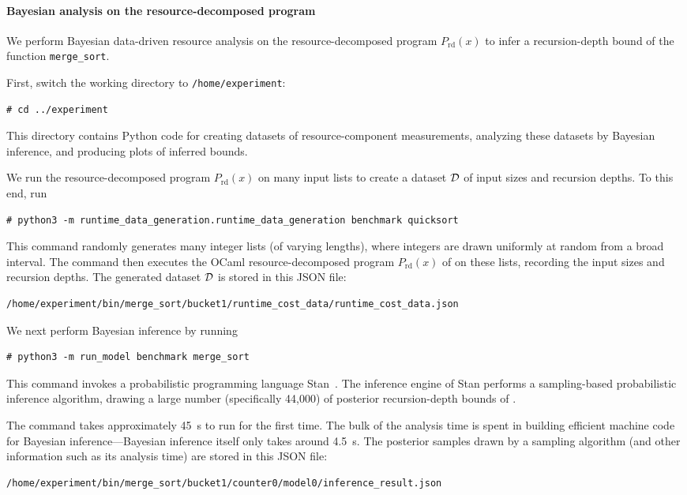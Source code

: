 \paragraph{Bayesian analysis on the resource-decomposed program}

We perform Bayesian data-driven resource analysis on the resource-decomposed
program $P_{\mathrm{rd}}(x)$ to infer a recursion-depth bound of the function
\texttt{merge\_sort}.

First, switch the working directory to \texttt{/home/experiment}:
\begin{verbatim}
# cd ../experiment
\end{verbatim}
%
This directory contains Python code for creating datasets of resource-component
measurements, analyzing these datasets by Bayesian inference, and producing
plots of inferred bounds.

We run the resource-decomposed program $P_{\mathrm{rd}}(x)$ on many input lists
to create a dataset $\mathcal{D}$ of input sizes and recursion depths.
%
To this end, run
\begin{verbatim}
# python3 -m runtime_data_generation.runtime_data_generation benchmark quicksort
\end{verbatim}
%
This command randomly generates many integer lists (of varying lengths), where
integers are drawn uniformly at random from a broad interval.
%
The command then executes the OCaml resource-decomposed program
$P_{\mathrm{rd}}(x)$ of \mergesort{} on these lists, recording the input sizes
and recursion depths.
%
The generated dataset $\mathcal{D}$ is stored in this JSON file:
\begin{verbatim}
/home/experiment/bin/merge_sort/bucket1/runtime_cost_data/runtime_cost_data.json
\end{verbatim}

We next perform Bayesian inference by running
\begin{verbatim}
# python3 -m run_model benchmark merge_sort
\end{verbatim}
%
This command invokes a probabilistic programming language
Stan~\citep{Carpenter2017}.
%
The inference engine of Stan performs a sampling-based probabilistic inference
algorithm, drawing a large number (specifically 44,000) of posterior
recursion-depth bounds of \mergesort{}.

The command takes approximately \qty{45}{\second} to run for the first time.
%
The bulk of the analysis time is spent in building efficient machine code for
Bayesian inference---Bayesian inference itself only takes around
\qty{4.5}{\second}.
%
The posterior samples drawn by a sampling algorithm (and other information such
as its analysis time) are stored in this JSON file:
\begin{verbatim}
/home/experiment/bin/merge_sort/bucket1/counter0/model0/inference_result.json
\end{verbatim}

